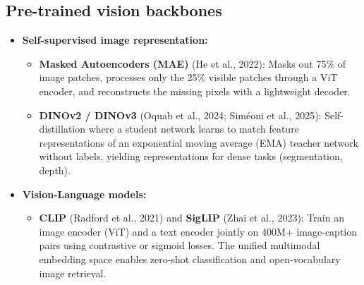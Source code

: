 \documentclass[11pt,a4paper]{article}
\newcommand{\slides}[1]{\par\nopagebreak\noindent{\normalfont\small\emph{(slides #1)}}\par\nopagebreak\vspace{2pt}}
\theoremstyle{definition}
\theoremstyle{plain}
\begin{document}
\subsection{Pre-trained vision backbones}\slides{82 / 84}
\begin{itemize}
\item \textbf{Self-supervised image representation:}
  \begin{itemize}[nosep]
  \item \textbf{Masked Autoencoders (MAE)} (He et al., 2022): Masks out 75\% of image patches, processes only the 25\% visible patches through a ViT encoder, and reconstructs the missing pixels with a lightweight decoder.
  \item \textbf{DINOv2 / DINOv3} (Oquab et al., 2024; Siméoni et al., 2025): Self-distillation where a student network learns to match feature representations of an exponential moving average (EMA) teacher network without labels, yielding representations for dense tasks (segmentation, depth).
  \end{itemize}
\item \textbf{Vision-Language models:}
  \begin{itemize}[nosep]
  \item \textbf{CLIP} (Radford et al., 2021) and \textbf{SigLIP} (Zhai et al., 2023): Train an image encoder (ViT) and a text encoder jointly on 400M+ image-caption pairs using contrastive or sigmoid losses. The unified multimodal embedding space enables zero-shot classification and open-vocabulary image retrieval.
  \end{itemize}
\end{itemize}
\end{document}
